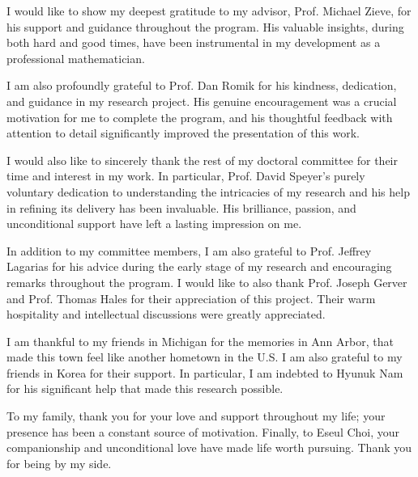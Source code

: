 I would like to show my deepest gratitude to my advisor, Prof. Michael Zieve,
for his support and guidance throughout the program.
His valuable insights, during both hard and good times,
have been instrumental in my development as a professional mathematician.

I am also profoundly grateful to Prof. Dan Romik for his kindness, dedication, 
and guidance in my research project.
His genuine encouragement was a crucial motivation for me to complete the program,
and his thoughtful feedback with attention to detail
significantly improved the presentation of this work.

I would also like to sincerely thank the rest of my doctoral committee for their time and interest in my work.
In particular, Prof. David Speyer's purely voluntary dedication to understanding the intricacies of my research and 
his help in refining its delivery has been invaluable.
His brilliance, passion, and unconditional support have left a lasting impression on me.

In addition to my committee members,
I am also grateful to Prof. Jeffrey Lagarias for his advice during the early stage of my research
and encouraging remarks throughout the program.
I would like to also thank Prof. Joseph Gerver and Prof. Thomas Hales for their appreciation of this project.
Their warm hospitality and intellectual discussions were greatly appreciated.

I am thankful to my friends in Michigan for the memories in Ann Arbor,
that made this town feel like another hometown in the U.S.
I am also grateful to my friends in Korea for their support.
In particular, I am indebted to Hyunuk Nam for his significant help that
made this research possible. 

To my family, thank you for your love and support throughout my life;
your presence has been a constant source of motivation.
Finally, to Eseul Choi, 
your companionship and unconditional love have made life worth pursuing.
Thank you for being by my side.